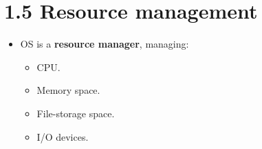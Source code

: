 \documentclass{article}
\begin{document}
\newpage
\section*{1.5 Resource management}
\begin{itemize}
    \item OS is a \textbf{resource manager}, managing:
    \begin{itemize}
        \item CPU.
        \item Memory space.
        \item File-storage space.
        \item I/O devices.
    \end{itemize}
\end{itemize}
\end{document}
